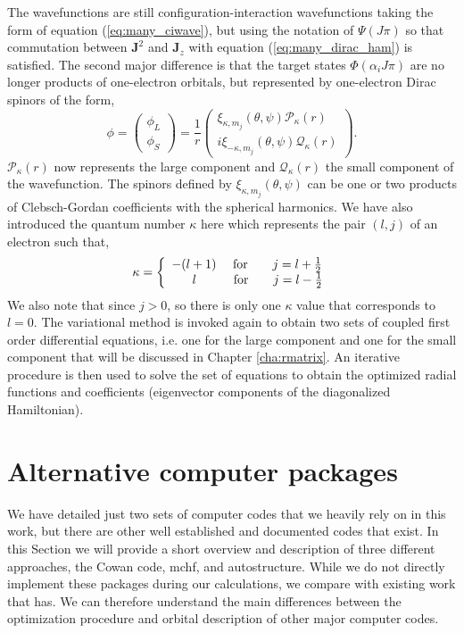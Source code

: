 The wavefunctions are still configuration-interaction wavefunctions taking the form of equation (\ref{eq:many_ciwave}), but using the notation of $\Psi(J\pi)$ so that commutation between $\boldsymbol{J}^2$ and $\boldsymbol{J}_z$ with equation (\ref{eq:many_dirac_ham}) is satisfied. The second major difference is that the target states $\Phi(\alpha_iJ\pi)$ are no longer products of one-electron orbitals, but represented by one-electron Dirac spinors of the form,
\begin{equation}\label{eq:many_diracwave}
\phi = \left( \begin{array}{c}
	\phi_{L}\\
	\phi_{S} \end{array} \right) = \frac{1}{r}\left( \begin{array}{c}
	\xi_{\kappa,m_j}(\theta,\psi)\mathcal{P}_{\kappa}(r)\\
	i\xi_{-\kappa,m_j}(\theta,\psi)\mathcal{Q}_{\kappa}(r) \end{array} \right) .
\end{equation}
$\mathcal{P}_{\kappa}(r)$ now represents the large component and $\mathcal{Q}_{\kappa}(r)$ the small component of the wavefunction. The spinors defined by $\xi_{\kappa,m_j}(\theta,\psi)$ can be one or two products of Clebsch-Gordan coefficients with the spherical harmonics. We have also introduced the quantum number $\kappa$ here which represents the pair $(l,j)$ of an electron such that,
\begin{equation}\label{eq:many_kappacoupling}
\kappa = \left\{
  \begin{array}{lr}
     -(l+1) ~~~~{\rm for}~~~~~~  j = l + \frac{1}{2}\\
    ~~~~~ l ~~~~~~~~~{\rm for}~~~~~~  j = l - \frac{1}{2}
  \end{array}
\right.
\end{equation}
We also note that since $j>0$, so there is only one $\kappa$ value that corresponds to $l=0$. The variational method is invoked again to obtain two sets of coupled first order differential equations, i.e. one for the large component and one for the small component that will be discussed in Chapter \ref{cha:rmatrix}. An iterative procedure is then used to solve the set of equations to obtain the optimized radial functions and coefficients (eigenvector components of the diagonalized Hamiltonian). 

\section{Alternative computer packages}\label{sec:many_alt}
We have detailed just two sets of computer codes that we heavily rely on in this work, but there are other well established and documented codes that exist. In this Section we will provide a short overview and description of three different approaches, the Cowan code, {\sc mchf}, and {\sc autostructure}. While we do not directly implement these packages during our calculations, we compare with existing work that has. We can therefore understand the main differences between the optimization procedure and orbital description of other major computer codes.

